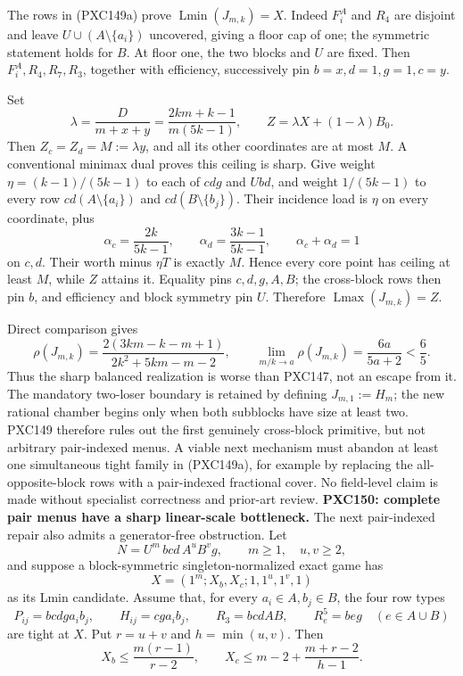 \documentclass[11pt]{article}
\newcommand{\Lmin}{\operatorname{Lmin}}
\newcommand{\Lmax}{\operatorname{Lmax}}
\begin{document}
The rows in (PXC149a) prove \(\Lmin(J_{m,k})=X\).  Indeed
\(F_i^A\) and \(R_4\) are disjoint and leave \(U\cup(A\setminus\{a_i\})\)
uncovered, giving a floor cap of one; the symmetric statement holds for
\(B\).  At floor one, the two blocks and \(U\) are fixed.  Then
\(F_i^A,R_4,R_7,R_3\), together with efficiency, successively pin
\(b=x,d=1,g=1,c=y\).

Set
\begin{equation}
 \lambda=\frac{D}{m+x+y}
   =\frac{2km+k-1}{m(5k-1)},\qquad
 Z=\lambda X+(1-\lambda)B_0.                         \tag{PXC149d}
\end{equation}
Then \(Z_c=Z_d=M:=\lambda y\), and all its other coordinates are at most
\(M\).  A conventional minimax dual proves this ceiling is sharp.  Give
weight \(\eta=(k-1)/(5k-1)\) to each of \(cdg\) and \(Ubd\), and weight
\(1/(5k-1)\) to every row \(cd(A\setminus\{a_i\})\) and
\(cd(B\setminus\{b_j\})\).  Their incidence load is \(\eta\) on every
coordinate, plus
\[
 \alpha_c=\frac{2k}{5k-1},\qquad
 \alpha_d=\frac{3k-1}{5k-1},\qquad \alpha_c+\alpha_d=1
\]
on \(c,d\).  Their worth minus \(\eta T\) is exactly \(M\).  Hence every
core point has ceiling at least \(M\), while \(Z\) attains it.  Equality
pins \(c,d,g,A,B\); the cross-block rows then pin \(b\), and efficiency and
block symmetry pin \(U\).  Therefore \(\Lmax(J_{m,k})=Z\).

Direct comparison gives
\begin{equation}
 \rho(J_{m,k})=
 \frac{2(3km-k-m+1)}{2k^2+5km-m-2},\qquad
 \lim_{m/k\to a}\rho(J_{m,k})=\frac{6a}{5a+2}<\frac65. \tag{PXC149e}
\end{equation}
Thus the sharp balanced realization is worse than PXC147, not an escape
from it.  The mandatory two-loser boundary is retained by defining
\(J_{m,1}:=H_m\); the new rational chamber begins only when both subblocks
have size at least two.  PXC149 therefore rules out the first genuinely
cross-block primitive, but not arbitrary pair-indexed menus.  A viable next
mechanism must abandon at least one simultaneous tight family in
(PXC149a), for example by replacing the all-opposite-block rows with a
pair-indexed fractional cover.  No field-level claim is made without
specialist correctness and prior-art review.
\medskip
\noindent\textbf{PXC150: complete pair menus have a sharp linear-scale
bottleneck.}
The next pair-indexed repair also admits a generator-free obstruction.  Let
\[
 N=U^m\,bcd\,A^uB^v g,\qquad m\ge1,\quad u,v\ge2,
\]
and suppose a block-symmetric singleton-normalized exact game has
\[
 X=(1^m;X_b,X_c;1,1^u,1^v,1)
\]
as its Lmin candidate.  Assume that, for every \(a_i\in A,b_j\in B\), the
four row types
\begin{equation}
 P_{ij}=bcdg a_i b_j,\qquad H_{ij}=cg a_i b_j,\qquad
 R_3=bcdAB,\qquad R^5_e=beg\quad(e\in A\cup B)       \tag{PXC150a}
\end{equation}
are tight at \(X\).  Put \(r=u+v\) and \(h=\min(u,v)\).  Then
\begin{equation}
 X_b\le \frac{m(r-1)}{r-2},\qquad
 X_c\le m-2+\frac{m+r-2}{h-1}.                       \tag{PXC150b}
\end{equation}
\end{document}
